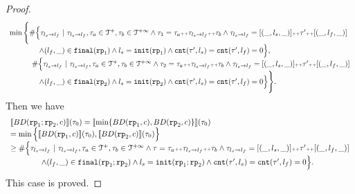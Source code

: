 \begin{proof}
\[\begin{array}{l}
      \min \Bigg\{ \#
      \Big\{\mathtt{\tau}_{l_s \to l_f} ~\vert~ \mathtt{\tau}_{l_s \to l_f}, \mathtt{\tau}_a \in \mathcal{T}^{+}, \mathtt{\tau}_b \in \mathcal{T}^{+\infty}
      \land \mathtt{\tau}_1 = \mathtt{\tau}_a {\scriptscriptstyle ++} \mathtt{\tau}_{l_s \to l_f} {\scriptscriptstyle ++} \mathtt{\tau}_b
      \land \mathtt{\tau}_{l_s \to l_f} = [(\_, l_s, \_)] {\scriptscriptstyle ++} \mathtt{\tau}' {\scriptscriptstyle ++} [(\_, l_f, \_)]
        \\ \qquad \qquad
      \land (l_{f}, \_) \in \mathtt{final}(\mathtt{rp}_1)
      \land l_s = \mathtt{init}(\mathtt{rp}_1)
      \land \mathtt{cnt}(\mathtt{\tau}', l_s) = \mathtt{cnt}(\mathtt{\tau}', l_f) = 0 
      \Big\},
      \\ \qquad \quad
      \#
      \Big\{\mathtt{\tau}_{l_s \to l_f} ~\vert~ \mathtt{\tau}_{l_s \to l_f}, \mathtt{\tau}_a \in \mathcal{T}^{+}, \mathtt{\tau}_b \in \mathcal{T}^{+\infty}
      \land \mathtt{\tau}_2 = \mathtt{\tau}_a {\scriptscriptstyle ++} \mathtt{\tau}_{l_s \to l_f} {\scriptscriptstyle ++} \mathtt{\tau}_b
      \land \mathtt{\tau}_{l_s \to l_f} = [(\_, l_s, \_)] {\scriptscriptstyle ++} \mathtt{\tau}' {\scriptscriptstyle ++} [(\_, l_f, \_)]
       \\ \qquad \qquad
     \land (l_{f}, \_) \in \mathtt{final}(\mathtt{rp}_2)
     \land l_s = \mathtt{init}(\mathtt{rp}_2)
     \land \mathtt{cnt}(\mathtt{\tau}', l_s) = \mathtt{cnt}(\mathtt{\tau}', l_f) = 0 
     \Big\} 
     \Bigg\}.
      \end{array}
    \]
    Then we have
    \[
      \begin{array}{l}
      \llbracket BD(\mathtt{rp}_1; \mathtt{rp}_2, c) \rrbracket(\mathtt{\tau}_0) =
      \llbracket \min \{ BD(\mathtt{rp}_1, c), BD(\mathtt{rp}_2, c) \} \rrbracket(\mathtt{\tau}_0)
      \\
      = \min \Big\{ \llbracket BD(\mathtt{rp}_1, c) \rrbracket(\mathtt{\tau}_0), \llbracket BD(\mathtt{rp}_2, c) \rrbracket(\mathtt{\tau}_0) \Big\}
      \\
      \geq
      \# \Big\{\mathtt{\tau}_{l_s \to l_f} ~\vert~ \mathtt{\tau}_{l_s \to l_f}, \mathtt{\tau}_a \in \mathcal{T}^{+}, \mathtt{\tau}_b \in \mathcal{T}^{+\infty}
      \land \mathtt{\tau} = \mathtt{\tau}_a {\scriptscriptstyle ++} \mathtt{\tau}_{l_s \to l_f} {\scriptscriptstyle ++} \mathtt{\tau}_b
      \land \mathtt{\tau}_{l_s \to l_f} = [(\_, l_s, \_)] {\scriptscriptstyle ++} \mathtt{\tau}' {\scriptscriptstyle ++} [(\_, l_f, \_)]
      \\ \qquad \qquad
      \land (l_{f}, \_) \in \mathtt{final}(\mathtt{rp}_1; \mathtt{rp}_2)
      \land l_s = \mathtt{init}(\mathtt{rp}_1; \mathtt{rp}_2)
      \land \mathtt{cnt}(\mathtt{\tau}', l_s) = \mathtt{cnt}(\mathtt{\tau}', l_f) = 0 
      \Big\}.
        \end{array}
    \]
This case is proved.

\end{proof}
